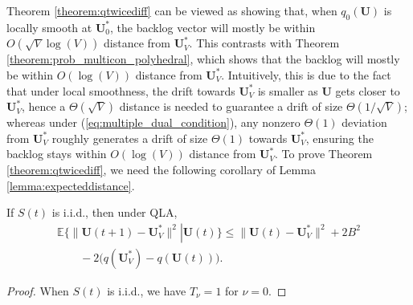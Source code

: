 \documentclass[journal]{IEEEtran}
\newcommand{\expect}[1]{\mathbb{E}\big\{#1\big\}}
\newcommand{\bv}[1]{{\boldsymbol{#1} }}
\begin{document}
Theorem \ref{theorem:qtwicediff} can be viewed as showing that, when $q_0(\bv{U})$ is locally smooth at $\bv{U}^*_0$, the backlog vector will mostly be within $O(\sqrt{V}\log(V))$ distance from $\bv{U}^*_V$. This contrasts with Theorem \ref{theorem:prob_multicon_polyhedral}, which shows that the backlog will mostly be within $O(\log(V))$ distance from $\bv{U}^*_V$. Intuitively,  this is due to the fact that under local smoothness, the drift towards $\bv{U}^*_V$ is smaller as $\bv{U}$ gets closer to $\bv{U}^*_V$, hence a $\Theta(\sqrt{V})$ distance is needed to guarantee a drift of size $\Theta(1/\sqrt{V})$; whereas under (\ref{eq:multiple_dual_condition}), any nonzero $\Theta(1)$ deviation from $\bv{U}^*_V$ roughly generates a drift of size $\Theta(1)$ towards $\bv{U}^*_V$, ensuring the backlog stays within $O(\log(V))$ distance from $\bv{U}^*_V$.
To prove Theorem \ref{theorem:qtwicediff}, we need the following corollary of Lemma \ref{lemma:expecteddistance}. 
\begin{coro}\label{coro:expecteddistance}
If $S(t)$ is i.i.d., then under QLA,
\begin{eqnarray*}
\expect{\|\bv{U}(t+1)-\bv{U}^*_V\|^2\left |\right. \bv{U}(t)}\leq \|\bv{U}(t)-\bv{U}^*_V\|^2  + 2B^2\nonumber\\
\qquad-2\big(q(\bv{U}^*_V)-q(\bv{U}(t))\big).\nonumber
\end{eqnarray*}
\end{coro}
\begin{proof}
When $S(t)$ is i.i.d., we have $T_{\nu}=1$ for $\nu=0$.
\end{proof}
\end{document}
